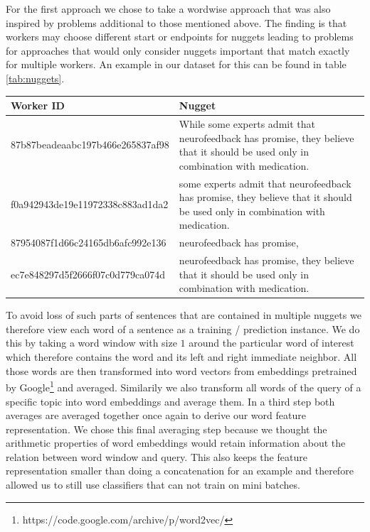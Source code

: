 \documentclass{article}
\begin{document}
For the first approach we chose to take a wordwise approach that was also inspired by problems additional to those mentioned above. The finding is that workers may choose different start or endpoints for nuggets leading to problems for approaches that would only consider nuggets important that match exactly for multiple workers. An example in our dataset for this can be found in table \ref{tab:nuggets}.
\begin{center}
	\begin{tabular}{ | l | p{7cm} |}
		\hline
		Worker ID & Nugget \\ \hline
		87b87beadeaabc197b466e265837af98 &  While some experts admit that neurofeedback has promise, they believe that it should be used only in combination with medication. \\ \hline
		f0a942943de19e11972338c883ad1da2 &  some experts admit that neurofeedback has promise, they believe that it should be used only in combination with medication. \\ \hline

		87954087f1d66c24165db6afc992e136 &  neurofeedback has promise, \\ \hline

		ec7e848297d5f2666f07c0d779ca074d	 &  neurofeedback has promise, they believe that it should be used only in combination with medication. \\
		\hline
	\end{tabular}
\label{tab:nuggets}
\end{center}
To avoid loss of such parts of sentences that are contained in multiple nuggets we therefore view each word of a sentence as a training / prediction instance. We do this by taking a word window with size $1$ around the particular word of interest which therefore contains the word and its left and right immediate neighbor. All those words are then transformed into word vectors from embeddings pretrained by Google\footnote{https://code.google.com/archive/p/word2vec/} and averaged. Similarily we also transform all words of the query of a specific topic into word embeddings and average them. In a third step both averages are averaged together once again to derive our word feature representation. We chose this final averaging step because we thought the arithmetic properties of word embeddings would retain information about the relation between word window and query. This also keeps the feature representation smaller than doing a concatenation for an example and therefore allowed us to still use classifiers that can not train on mini batches.
\end{document}
